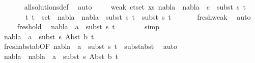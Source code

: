 \begin{isabellebody}
\ \ \ \ \ \isamarkupfalse%
\ all{\isacharunderscore}{\kern0pt}solutions{\isacharunderscore}{\kern0pt}def\ \isamarkupfalse%
\ auto\isanewline
\ \ \ \isamarkupfalse%
\ weak{}{\isacharcolon}{\kern0pt}\ {\isachardoublequoteopen}{\isasymforall}{\isacharparenleft}{\kern0pt}c{\isacharcomma}{\kern0pt}t{\isacharparenright}{\kern0pt}{\isasymin}set\ xs{\isachardot}{\kern0pt}\ {\isacharparenleft}{\kern0pt}nabla{}\ {\isasymunion}\ nabla{}{\isacharparenright}{\kern0pt}\ {\isasymturnstile}\ c\ {\isasymsharp}\ subst\ s{}\ t{\isachardoublequoteclose}\isanewline
\ \ \ \ \ \ {\isachardoublequoteopen}{\isasymforall}\ {\isacharparenleft}{\kern0pt}t{}{\isacharcomma}{\kern0pt}\ t{}{\isacharparenright}{\kern0pt}\ {\isasymin}\ set\ {\isacharbrackleft}{\kern0pt}{\isacharbrackright}{\kern0pt}{\isachardot}{\kern0pt}\ {\isacharparenleft}{\kern0pt}nabla{}\ {\isasymunion}\ nabla{}{\isacharparenright}{\kern0pt}\ {\isasymturnstile}\ subst\ s{}\ t{}\ {\isasymapprox}\ subst\ s{}\ t{}{\isachardoublequoteclose}\isanewline
\ \ \ \ \ \isamarkupfalse%
\ fresh{\isacharunderscore}{\kern0pt}weak\ \isamarkupfalse%
\ auto\isanewline
\ \ \ \isamarkupfalse%
\ fresh{\isacharunderscore}{\kern0pt}old\ \isamarkupfalse%
\ {\isachardoublequoteopen}nabla{}\ {\isasymturnstile}\ a\ {\isasymsharp}\ subst\ s{}\ t{\isacharprime}{\kern0pt}{\isachardoublequoteclose}\ \isanewline
\ \ \ \ \ \isamarkupfalse%
\ simp\isanewline
\ \ \ \isamarkupfalse%
\ {\isachardoublequoteopen}nabla{}\ {\isasymturnstile}\ a\ {\isasymsharp}\ subst\ s{}\ {\isacharparenleft}{\kern0pt}Abst\ b\ t{\isacharprime}{\kern0pt}{\isacharparenright}{\kern0pt}{\isachardoublequoteclose}\isanewline
\ \ \ \isamarkupfalse%
\ fresh{\isacharunderscore}{\kern0pt}abst{\isacharunderscore}{\kern0pt}ab{\isacharbrackleft}{\kern0pt}OF\ {\isacartoucheopen}nabla{}\ {\isasymturnstile}\ a\ {\isasymsharp}\ subst\ s{}\ t{\isacharprime}{\kern0pt}{\isacartoucheclose}\ {}{\isacharparenleft}{\kern0pt}{}{\isacharparenright}{\kern0pt}{\isacharbrackright}{\kern0pt}\ subst{\isacharunderscore}{\kern0pt}abst\ \isamarkupfalse%
\ auto\isanewline
\ \ \ \isamarkupfalse%
\ {\isachardoublequoteopen}{\isacharparenleft}{\kern0pt}nabla{}\ {\isasymunion}\ nabla{}{\isacharparenright}{\kern0pt}\ {\isasymturnstile}\ a\ {\isasymsharp}\ subst\ s{}\ {\isacharparenleft}{\kern0pt}Abst\ b\ t{\isacharprime}{\kern0pt}{\isacharparenright}{\kern0pt}{\isachardoublequoteclose}\isanewline

\end{isabellebody}
